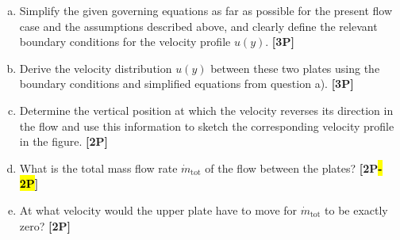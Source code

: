 \begin{enumerate}[a)]
\item Simplify the given governing equations as far as possible for the present flow case and the assumptions described above, and clearly define the relevant boundary conditions for the velocity profile $u(y)$. \textbf{[3P]}
\item Derive the velocity distribution $u(y)$ between these two plates using the boundary conditions and simplified equations from question a). \textbf{[3P]}
\item Determine the vertical position at which the velocity reverses its direction in the flow and use this information to sketch the corresponding velocity profile in the figure. \textbf{[2P]}
\item  What is the total mass flow rate $\dot{m}_\text{tot}$ of the flow between the plates? \textbf{[2P\hl{-2P}]}
\item At what velocity would the upper plate have to move for $\dot{m}_\text{tot}$ to be exactly zero? \textbf{[2P]}




\end{enumerate}


